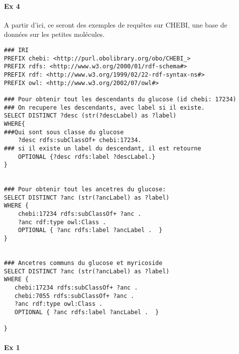 \documentclass[11pt,a4paper]{article}
\begin{document}
\paragraph*{Ex 4}
A partir d'ici, ce seront des exemples de requêtes sur CHEBI, une base de données sur les petites molécules.
\begin{lstlisting}
### IRI
PREFIX chebi: <http://purl.obolibrary.org/obo/CHEBI_>
PREFIX rdfs: <http://www.w3.org/2000/01/rdf-schema#>
PREFIX rdf: <http://www.w3.org/1999/02/22-rdf-syntax-ns#>
PREFIX owl: <http://www.w3.org/2002/07/owl#>

### Pour obtenir tout les descendants du glucose (id chebi: 17234)
### On recupere les descendants, avec label si il existe.
SELECT DISTINCT ?desc (str(?descLabel) as ?label)
WHERE{
###Qui sont sous classe du glucose
    ?desc rdfs:subClassOf+ chebi:17234.
### si il existe un label du descendant, il est retourne
    OPTIONAL {?desc rdfs:label ?descLabel.}
}
    
    
### Pour obtenir tout les ancetres du glucose:
SELECT DISTINCT ?anc (str(?ancLabel) as ?label)
WHERE {
    chebi:17234 rdfs:subClassOf+ ?anc .
    ?anc rdf:type owl:Class .
    OPTIONAL { ?anc rdfs:label ?ancLabel .  }
}


### Ancetres communs du glucose et myricoside
SELECT DISTINCT ?anc (str(?ancLabel) as ?label)
WHERE {
   chebi:17234 rdfs:subClassOf+ ?anc .
   chebi:7055 rdfs:subClassOf+ ?anc .
   ?anc rdf:type owl:Class .
   OPTIONAL { ?anc rdfs:label ?ancLabel .  }

}

\end{lstlisting}

\paragraph*{Ex 1}
\begin{lstlisting}
\end{lstlisting}
\end{document}
